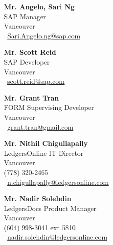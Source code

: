 \begin{paracol}{3}

        \textbf {Mr. Angelo, Sari Ng}\\
    SAP Manager\\
    Vancouver\\
    \Letter\ \href{mailto:sari.angelo.ng@sap.com}{Sari.Angelo.ng@sap.com}
        
    \textbf {Mr. Scott Reid}\\
    SAP Developer\\
    Vancouver\\
    \Letter\ \href{mailto:scott.reid@sap.com}{scott.reid@sap.com}

    
    
    
 \switchcolumn
 
    
    \textbf {Mr. Grant Tran}\\
    FORM Supervising Developer\\
    Vancouver\\
    \Letter\ \href{mailto:grant.tran@gmail.com}{grant.tran@gmail.com}
    
        \textbf {Mr. Nithil Chigullapally}\\
    LedgersOnline IT Director\\
    Vancouver\\
    (778) 320-2465\\
    \Letter\ \href{mailto:n.chigullapally@ledgersonline.com}{n.chigullapally@ledgersonline.com}
    
    

    

\switchcolumn

          \textbf {Mr. Nadir Solehdin}\\
    LedgersDocs Product Manager\\
    Vancouver\\
    (604) 998-3041 ext 5810 \\
    \Letter\ \href{mailto:nadir.solehdin@ledgersonline.com}{nadir.solehdin@ledgersonline.com}


\end{paracol}
